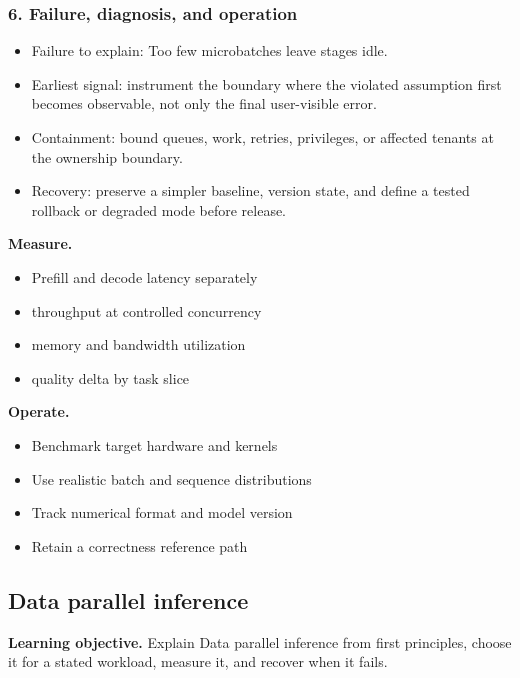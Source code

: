 \subsubsection*{6. Failure, diagnosis, and operation}
\begin{itemize}
\item Failure to explain: Too few microbatches leave stages idle.
\item Earliest signal: instrument the boundary where the violated assumption first becomes observable, not only the final user-visible error.
\item Containment: bound queues, work, retries, privileges, or affected tenants at the ownership boundary.
\item Recovery: preserve a simpler baseline, version state, and define a tested rollback or degraded mode before release.
\end{itemize}
\textbf{Measure.}\begin{itemize}
\item Prefill and decode latency separately
\item throughput at controlled concurrency
\item memory and bandwidth utilization
\item quality delta by task slice
\end{itemize}
\textbf{Operate.}\begin{itemize}
\item Benchmark target hardware and kernels
\item Use realistic batch and sequence distributions
\item Track numerical format and model version
\item Retain a correctness reference path
\end{itemize}
\subsection{Data parallel inference}
\textbf{Learning objective.} Explain Data parallel inference from first principles, choose it for a stated workload, measure it, and recover when it fails.
